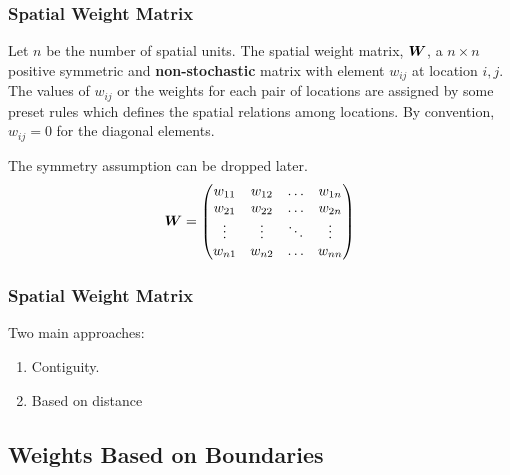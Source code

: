 \documentclass[english,10pt]{beamer}\usepackage[]{graphicx}\usepackage[]{xcolor}
\begin{document}
\begin{frame}
  \frametitle{Spatial Weight Matrix}
    \begin{definition}[$\mW$ Matrix]
      Let $n$ be the number of spatial units. The spatial weight matrix, $\mW$, a $n\times n$ positive symmetric and \textbf{non-stochastic} matrix with element $w_{ij}$ at location $i,j$. The values of $w_{ij}$ or the weights for each pair of locations are assigned by some preset rules which defines the spatial relations among locations. By convention, $w_{ij} = 0$ for the diagonal elements.
    \end{definition}
    \alert{The symmetry assumption can be dropped later.} 
    \begin{equation*}
\bm W = \begin{pmatrix}
        w_{11} & w_{12} & \hdots & w_{1n} \\ 
        w_{21} & w_{22} & \hdots & w_{2n} \\
        \vdots & \vdots & \ddots & \vdots \\
        w_{n1} & w_{n2} & \hdots & w_{nn} 
      \end{pmatrix}
\end{equation*}
\end{frame}


\begin{frame}
  \frametitle{Spatial Weight Matrix}
  Two main approaches:
    \begin{enumerate}
      \item Contiguity.
      \item Based on distance
    \end{enumerate}
\end{frame}

\subsection{Weights Based on Boundaries}
\end{document}
